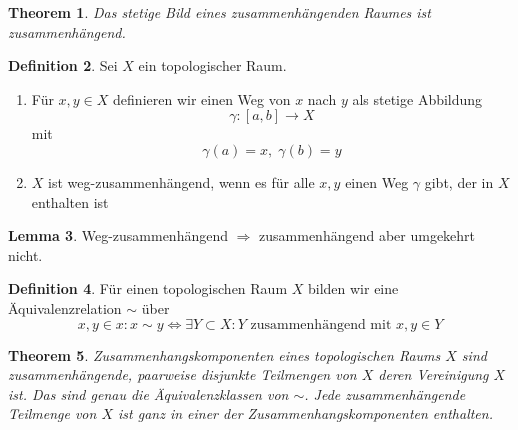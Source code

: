 \documentclass[a4paper, 12pt]{article}
\theoremstyle{plain}
\newtheorem{theorem}{Theorem}[section] %
\theoremstyle{definition}
\newtheorem{definition}[theorem]{Definition} %
\theoremstyle{lemma}
\newtheorem{lemma}[theorem]{Lemma}
\theoremstyle{remark}
\theoremstyle{corollary}
\theoremstyle{example}
\begin{document}
	\begin{theorem}
		Das stetige Bild eines zusammenhängenden Raumes ist zusammenhängend.
	\end{theorem}
	\begin{definition}
		Sei $X$ ein topologischer Raum. \begin{enumerate}
			\item Für $x,y \in X$ definieren wir einen Weg von $x$ nach $y$ als stetige Abbildung \[\gamma: [a,b] \to X\] mit \[\gamma(a) = x, \; \gamma(b) = y\]
			\item $X$ ist weg-zusammenhängend, wenn es für alle $x,y$ einen Weg $\gamma$ gibt, der in $X$ enthalten ist
		\end{enumerate}
	\end{definition}
	\begin{lemma}
		Weg-zusammenhängend $\Rightarrow$ zusammenhängend aber umgekehrt nicht.
	\end{lemma}
	\begin{definition}
		Für einen topologischen Raum $X$ bilden wir eine Äquivalenzrelation $\sim$ über \[x,y \in x: x \sim y \Leftrightarrow \exists Y \subset X: Y \text{ zusammenhängend mit } x,y \in Y\] 
	\end{definition}
	\begin{theorem}
		Zusammenhangskomponenten eines topologischen Raums $X$ sind zusammenhängende, paarweise disjunkte Teilmengen von $X$ deren Vereinigung $X$ ist. Das sind genau die Äquivalenzklassen von $\sim$. Jede zusammenhängende Teilmenge von $X$ ist ganz in einer der Zusammenhangskomponenten enthalten.
	\end{theorem}
\end{document}
